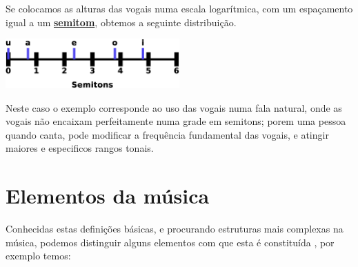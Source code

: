 \begin{elaboracion}[title=Timbre das vogais]
Se colocamos as alturas das vogais numa escala logarítmica, com um espaçamento igual a um
\hyperref[sec:pos:Semitom]{\textbf{semitom}},
obtemos a seguinte distribuição.
\begin{center}
\includegraphics[width=0.5\textwidth]{chapters/cap-musica-basica/vocales-semitons2a.eps}
\end{center}
Neste caso o exemplo corresponde ao uso das vogais numa fala natural, 
onde as vogais não encaixam perfeitamente numa grade em semitons;
porem uma pessoa quando canta, pode modificar a frequência fundamental das vogais,
e atingir maiores e especificos rangos tonais. 
\label{fig:timbresvocais}
\end{elaboracion}


\section{Elementos da música}

Conhecidas estas definições básicas, e procurando estruturas mais complexas na música,
podemos distinguir alguns elementos com que esta é constituída \cite[pp. 11]{alves2004teoria}, 
por exemplo temos:

